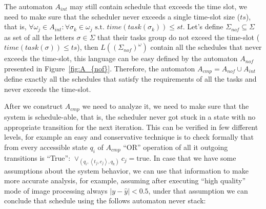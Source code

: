 \documentclass[ twoside, 12pt ]{article}
\begin{document}
{%
The automaton $A_{int}$ may still contain schedule that exceeds the time slot, we need to make sure that the scheduler never exceeds a single time-slot size ($ts$), that is, $\forall \omega_j \in A_{int} : \forall \sigma_k \in \omega_j \text{~s.t.~} time( task(\sigma_k)) \le st $.
Let's define $\Sigma_{nof} \subseteq \Sigma$ as set of all the letters $\sigma \in \Sigma$ that their tasks group do not exceed the time-slot ($time( task(\sigma)) \le ts$), then $L((\Sigma_{nof})^\omega)$ contain all the schedules that never exceeds the time-slot, this language can be easy defined by the automaton $A_{nof}$ presented in Figure~\ref{fig:A_{nof}}. 
Therefore, the automaton $A_{cmp} =  A_{nof} \cup A_{int}$ define exactly all the schedules that satisfy the requirements of all the tasks and never exceeds the time-slot.

After we construct $A_{cmp}$ we need to analyze it, we need to make sure that the system is schedule-able, that is, the scheduler never got stuck in a state with no appropriate transition for the next iteration.
This can be verified in few different levels, for example an easy and conservative technique is to check formally that from every accessible state $q_i$ of $A_{cmp}$ ``OR'' operation of all it outgoing transitions is ``True'': $\vee_{(q_i, \left < t_j, c_j \right > , q_k)}  c_j = \text{true} $. 
In case that we have some assumptions about the system behavior, we can use that information to make more accurate analysis, for example, assuming after executing ``high quality'' mode of image processing always $|y-\hat{y}| < 0.5$, under that assumption we can conclude that schedule using the follows automaton never stack:
\begin{center}
\end{center}
} 
\end{document}
